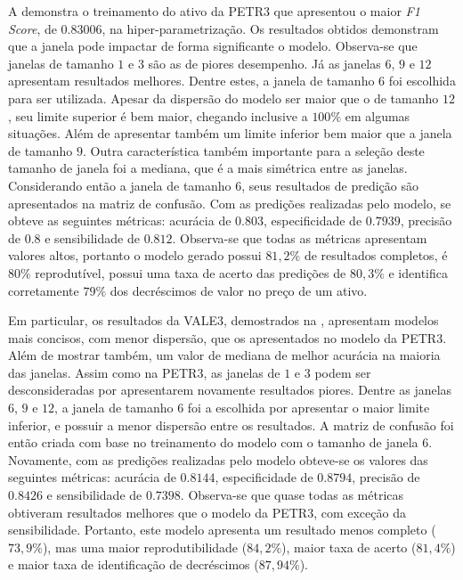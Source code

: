 A  demonstra o treinamento do ativo da PETR3 que apresentou o maior \emph{F1 Score}, de $0.83006$, na hiper-parametrização. Os resultados obtidos demonstram que a janela pode impactar de forma significante o modelo. Observa-se que janelas de tamanho $1$ e $3$ são as de piores desempenho. Já as janelas $6$, $9$ e $12$ apresentam resultados melhores. Dentre estes, a janela de tamanho $6$ foi escolhida para ser utilizada. Apesar da dispersão do modelo ser maior que o de tamanho $12$, seu limite superior é bem maior, chegando inclusive a $100\%$ em algumas situações. Além de apresentar também um limite inferior bem maior que a janela de tamanho $9$. Outra característica também importante para a seleção deste tamanho de janela foi a mediana, que é a mais simétrica entre as janelas. Considerando então a janela de tamanho $6$, seus resultados de predição são apresentados na matriz de confusão. Com as predições realizadas pelo modelo, se obteve as seguintes métricas: acurácia de $0.803$, especificidade de $0.7939$, precisão de $0.8$ e sensibilidade de $0.812$. Observa-se que todas as métricas apresentam valores altos, portanto o modelo gerado possui $81,2\%$ de resultados completos, é $80\%$ reprodutível, possui uma taxa de acerto das predições de $80,3\%$ e identifica corretamente $79\%$ dos decréscimos de valor no preço de um ativo.


Em particular, os resultados da VALE3, demostrados na , apresentam modelos mais concisos, com menor dispersão, que os apresentados no modelo da PETR3. Além de mostrar também, um valor de mediana de melhor acurácia na maioria das janelas. Assim como na PETR3, as janelas de $1$ e $3$ podem ser desconsideradas por apresentarem novamente resultados piores. Dentre as janelas $6$, $9$ e $12$, a janela de tamanho $6$ foi a escolhida por apresentar o maior limite inferior, e possuir a menor dispersão entre os resultados. A matriz de confusão foi então criada com base no treinamento do modelo com o tamanho de janela $6$. Novamente, com as predições realizadas pelo modelo obteve-se os valores das seguintes métricas: acurácia de $0.8144$, especificidade de $0.8794$, precisão de $0.8426$ e sensibilidade de $0.7398$. Observa-se que quase todas as métricas obtiveram resultados melhores que o modelo da PETR3, com exceção da sensibilidade. Portanto, este modelo apresenta um resultado menos completo ($73,9\%$), mas uma maior reprodutibilidade ($84,2\%$), maior taxa de acerto ($81,4\%$) e maior taxa de identificação de decréscimos ($87,94\%$).

